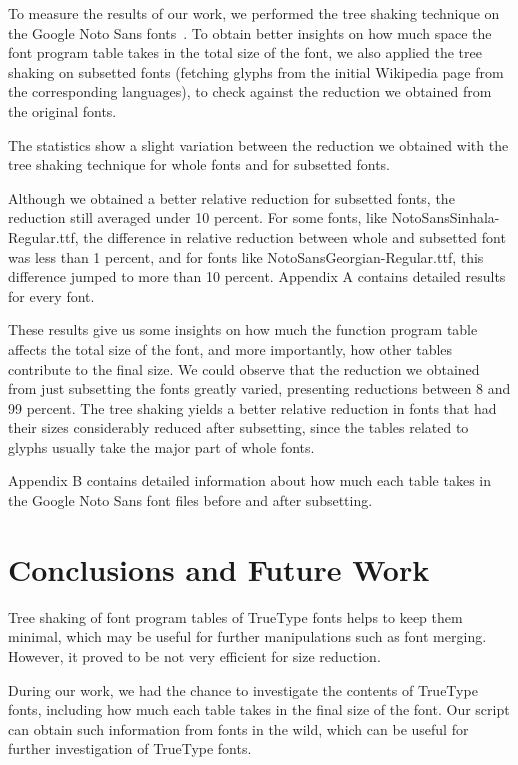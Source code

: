 \documentclass[12pt]{article}
\begin{document}
To measure the results of our work, we performed the tree shaking
technique on the Google Noto Sans fonts~\cite{notosans}. To obtain
better insights on how much space the font program table takes in the total
size of the font, we also applied the tree shaking on subsetted fonts
(fetching glyphs from the initial Wikipedia page from the corresponding
languages), to check against the reduction we obtained from the original
fonts.



The statistics show a slight variation between the reduction we obtained
with the tree shaking technique for whole fonts and for subsetted fonts.

Although we obtained a better relative reduction for subsetted fonts, the
reduction still averaged under 10 percent. For some fonts, like
NotoSansSinhala-Regular.ttf, the difference in relative reduction
between whole and subsetted font was less than 1 percent, and for fonts
like NotoSansGeorgian-Regular.ttf, this difference jumped to more than
10 percent. Appendix A contains detailed results for every font.

These results give us some insights on how much the function program
table affects the total size of the font, and more importantly, how
other tables contribute to the final size. We could observe that the
reduction we obtained from just subsetting the fonts greatly
varied, presenting reductions between 8 and 99 percent. The tree shaking
yields a better relative reduction in fonts that had their sizes
considerably reduced after subsetting, since the tables related to
glyphs usually take the major part of whole fonts.

Appendix B contains detailed information about how much each table takes
in the Google Noto Sans font files before and after subsetting.

\section{Conclusions and Future Work}

Tree shaking of font program tables of TrueType fonts helps to keep
them minimal, which may be useful for further manipulations such as
font merging. However, it proved to be not very efficient for size
reduction.

During our work, we had the chance to investigate the contents
of TrueType fonts, including how much each table takes in the final size
of the font. Our script can obtain such information from fonts in the
wild, which can be useful for further investigation of TrueType fonts.
\end{document}
